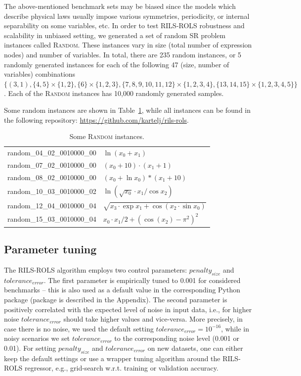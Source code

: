 \documentclass{bmcart}
\begin{document}
The above-mentioned benchmark sets may be biased since the models which describe physical laws usually impose various symmetries, periodicity, or internal separability on some variables, etc. In order to test \textsc{RILS-ROLS} robustness and scalability in unbiased setting, we generated a set of random SR problem instances called \textsc{Random}. These instances vary in size (total number of expression nodes) and number of variables. In total, there are 235 random instances, or 5 randomly generated instances for each of the following 47 (size, number of variables) combinations $\{(3, 1), \{4, 5\} \times \{1, 2\}, \{6\} \times \{1, 2, 3\}, \{7, 8, 9, 10, 11, 12\} \times \{1, 2, 3, 4\}, \{13, 14, 15\} \times \{1, 2, 3, 4, 5\}\}$. Each of the \textsc{Random} instances has 10,000 randomly generated samples. 

Some random instances are shown in Table~\ref{table:random}, while all instances can be found in %
 the following repository: \url{https://github.com/kartelj/rils-rols}.  

\begin{table}
	\caption{Some \textsc{Random} instances.}
	\label{table:random}
	\centering
	\begin{tabular}{ll} \\ \hline
		random\_04\_02\_0010000\_00 &	$\ln{(x_0 + x_1)}$\\
		random\_07\_02\_0010000\_00 &	$(x_0 + 10)\cdot (x_1 + 1)$\\
		random\_08\_02\_0010000\_00 &	$(x_0 + \ln{x_0})*(x_1 + 10)$\\
		random\_10\_03\_0010000\_02 &	$\ln{(\sqrt{x_0} \cdot x_1/\cos{x_2})}$\\
		random\_12\_04\_0010000\_04 &	$\sqrt{x_3 \cdot \exp{x_1} + \cos{(x_2 \cdot \sin{x_0})}}$\\
		random\_15\_03\_0010000\_04	&   $x_0 \cdot x_1/2 + (\cos{(x_2)} - \pi^2)^2$\\
		\hline
	\end{tabular}
\end{table}

\subsection{Parameter tuning}

The \textsc{RILS}-\textsc{ROLS} algorithm employs two control parameters: $penalty_{size}$ and $tolerance_{error}$. The first parameter is empirically tuned to 0.001 for considered benchmarks -- this is also used as a default value in the corresponding Python package (package is described in the Appendix). The second parameter is positively correlated with the expected level of noise in input data, i.e., for higher noise $tolerance_{error}$ should take higher values and vice-versa. More precisely, in case there is no noise, we used the default setting $tolerance_{error}=10^{-16}$, while in noisy scenarios we set $tolerance_{error}$ to the corresponding noise level (0.001 or 0.01). 
For setting $penalty_{size}$ and $tolerance_{error}$ on new datasets, one can either keep the default settings or use a wrapper tuning algorithm around the \textsc{RILS-ROLS} regressor, e.g., grid-search w.r.t. training or validation accuracy. 
\end{document}
